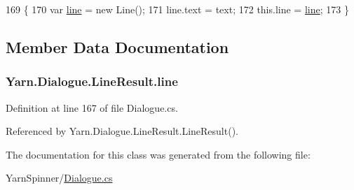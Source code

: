 \begin{DoxyCode}
169                                             \{
170                 var \hyperlink{a00126_abfbb0ea840b02acd0ecdc72c5b120257}{line} = \textcolor{keyword}{new} Line();
171                 line.text = text;
172                 this.line = \hyperlink{a00126_abfbb0ea840b02acd0ecdc72c5b120257}{line};
173             \}
\end{DoxyCode}


\subsection{Member Data Documentation}
\hypertarget{a00126_abfbb0ea840b02acd0ecdc72c5b120257}{
\subsubsection[{line}]{ Yarn.\-Dialogue.\-Line\-Result.\-line}}\label{a00126_abfbb0ea840b02acd0ecdc72c5b120257}


Definition at line 167 of file Dialogue.\-cs.



Referenced by Yarn.\-Dialogue.\-Line\-Result.\-Line\-Result().



The documentation for this class was generated from the following file\-:\begin{DoxyCompactItemize}
\item 
Yarn\-Spinner/\hyperlink{a00285}{Dialogue.\-cs}\end{DoxyCompactItemize}
